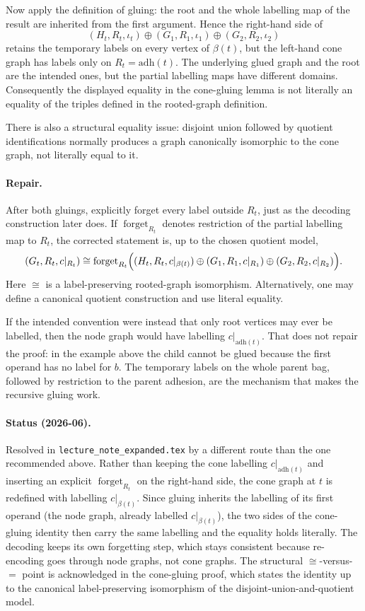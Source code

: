 \documentclass[11pt]{article}
\newcommand{\adh}{\ensuremath{\mathrm{adh}}}
\begin{document}
Now apply the definition of gluing: the root and the whole labelling map of the
result are inherited from the first argument.  Hence the right-hand side of
\[
  (H_t,R_t,\iota_t)\oplus(G_1,R_1,\iota_1)
    \oplus(G_2,R_2,\iota_2)
\]
retains the temporary labels on every vertex of \(\beta(t)\), but the left-hand
cone graph has labels only on \(R_t=\adh(t)\).  The underlying glued graph and
the root are the intended ones, but the partial labelling maps have different
domains.  Consequently the displayed equality in the cone-gluing lemma is not
literally an equality of the triples defined in the rooted-graph definition.

There is also a structural equality issue: disjoint union followed by quotient
identifications normally produces a graph canonically isomorphic to the cone
graph, not literally equal to it.

\paragraph{Repair.} After both gluings, explicitly forget every label outside
\(R_t\), just as the decoding construction later does.  If
\(\operatorname{forget}_{R_t}\) denotes restriction of the partial labelling
map to \(R_t\), the corrected statement is, up to the chosen quotient model,
\[
  (G_t,R_t,c|_{R_t})\cong
  \operatorname{forget}_{R_t}\Bigl(
    (H_t,R_t,c|_{\beta(t)})\oplus
    (G_1,R_1,c|_{R_1})\oplus
    (G_2,R_2,c|_{R_2})
  \Bigr).
\]
Here \(\cong\) is a label-preserving rooted-graph isomorphism.  Alternatively,
one may define a canonical quotient construction and use literal equality.

If the intended convention were instead that only root vertices may ever be
labelled, then the node graph would have labelling \(c|_{\adh(t)}\).  That does
not repair the proof: in the example above the child cannot be glued because
the first operand has no label for \(b\).  The temporary labels on the whole
parent bag, followed by restriction to the parent adhesion, are the mechanism
that makes the recursive gluing work.

\paragraph{Status (2026-06).} Resolved in \texttt{lecture\_note\_expanded.tex}
by a different route than the one recommended above.  Rather than keeping the
cone labelling \(c|_{\adh(t)}\) and inserting an explicit
\(\operatorname{forget}_{R_t}\) on the right-hand side, the cone graph at \(t\)
is redefined with labelling \(c|_{\beta(t)}\).  Since gluing inherits the
labelling of its first operand (the node graph, already labelled
\(c|_{\beta(t)}\)), the two sides of the cone-gluing identity then carry the same
labelling and the equality holds literally.  The decoding keeps its own
forgetting step, which stays consistent because re-encoding goes through node
graphs, not cone graphs.  The structural \(\cong\)-versus-\(=\) point is
acknowledged in the cone-gluing proof, which states the identity up to the
canonical label-preserving isomorphism of the disjoint-union-and-quotient model.
\end{document}
